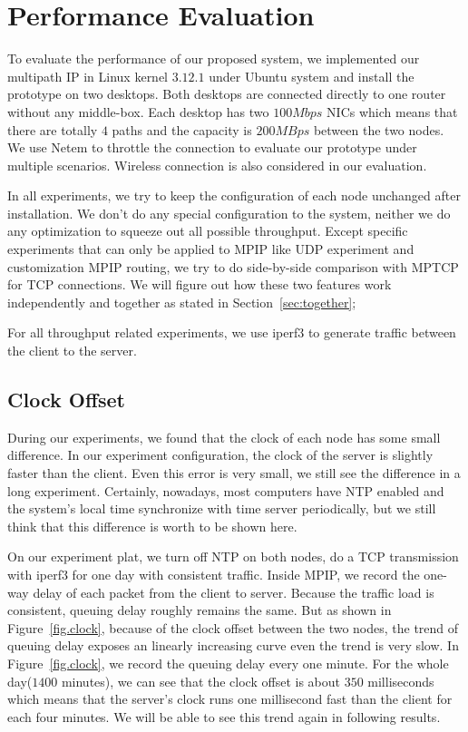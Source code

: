 \section{Performance Evaluation}
\label{sec:evaluation}

To evaluate the performance of our proposed system, we implemented our multipath IP in Linux kernel $3.12.1$ under Ubuntu system and install the prototype on two desktops. Both desktops are connected directly to one router without any middle-box. Each desktop has two $100Mbps$ NICs which means that there are totally $4$ paths and the capacity is $200MBps$ between the two nodes. We use Netem\cite{netem} to throttle the connection to evaluate our prototype under multiple scenarios. Wireless connection is also considered in our evaluation.

In all experiments, we try to keep the configuration of each node unchanged after installation. We don't do any special configuration to the system, neither we do any optimization to squeeze out all possible throughput. Except specific experiments that can only be applied to MPIP like UDP experiment and customization MPIP routing, we try to do side-by-side comparison with MPTCP for TCP connections. We will figure out how these two features work independently and together as stated in Section~\ref{sec:together};

For all throughput related experiments, we use iperf3 to generate traffic between the client to the server.


\subsection{Clock Offset}
\label{sec:clock}

During our experiments, we found that the clock of each node has some small difference. In our experiment configuration, the clock of the server is slightly faster than the client. Even this error is very small, we still see the difference in a long experiment.
Certainly, nowadays, most computers have NTP enabled and the system's local time synchronize with time server periodically, but we still think that this difference is worth to be shown here.

On our experiment plat, we turn off NTP on both nodes, do a TCP transmission with iperf3 for one day with consistent traffic. Inside MPIP, we record the one-way delay of each packet from the client to server. Because the traffic load is consistent, queuing delay roughly remains the same. But as shown in Figure~\ref{fig.clock}, because of the clock offset between the two nodes, the trend of queuing delay exposes an linearly increasing curve even the trend is very slow. In Figure~\ref{fig.clock}, we record the queuing delay every one minute. For the whole day($1400$ minutes), we can see that the clock offset is about $350$ milliseconds which means that the server's clock runs one millisecond fast than the client for each four minutes. We will be able to see this trend again in following results.

